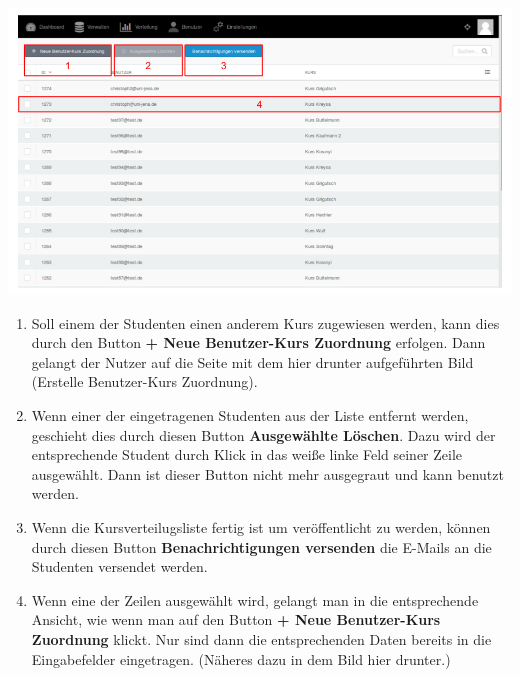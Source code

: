   \includegraphics[scale=0.3]{backend/img/distribution_4.png}
  \begin{enumerate}
   \item Soll einem der Studenten einen anderem Kurs zugewiesen werden, kann dies durch den Button \textbf{+ Neue Benutzer-Kurs Zuordnung} erfolgen.
	 Dann gelangt der Nutzer auf die Seite mit dem hier drunter aufgeführten Bild (Erstelle Benutzer-Kurs Zuordnung).
   \item Wenn einer der eingetragenen Studenten aus der Liste entfernt werden, geschieht dies durch diesen Button \textbf{Ausgewählte Löschen}.
	 Dazu wird der entsprechende Student durch Klick in das weiße linke Feld seiner Zeile ausgewählt.
	 Dann ist dieser Button nicht mehr ausgegraut und kann benutzt werden.
   \item Wenn die Kursverteilugsliste fertig ist um veröffentlicht zu werden, 
	 können durch diesen Button \textbf{Benachrichtigungen versenden} die E-Mails an die Studenten versendet werden.
   \item Wenn eine der Zeilen ausgewählt wird, gelangt man in die entsprechende Ansicht, wie wenn man auf den Button \textbf{+ Neue Benutzer-Kurs Zuordnung} klickt.
	 Nur sind dann die entsprechenden Daten bereits in die Eingabefelder eingetragen. (Näheres dazu in dem Bild hier drunter.)
  \end{enumerate}

